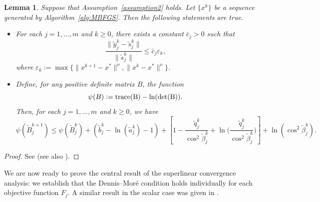\documentclass[11pt]{article}
\newtheorem{lemma}[theorem]{Lemma}
\numberwithin{assumption}{section}
\newcommand{\xs}{x^{\ast}}
\newcommand{\ty}{\tilde{y}_j^k}
\newcommand{\ts}{\tilde{s}_j^k}
\newcommand{\tq}{\tilde{q}_j^k}
\newcommand{\ta}{\tilde{a}_j^k}
\newcommand{\tB}{\tilde{B}_j^k}
\newcommand{\tb}{\tilde{b}_j^k}
\newcommand{\tr}{\rm{trace}}
\begin{document}
\begin{lemma}\label{l:rj}
Suppose that Assumption~\ref{assumption2} holds. Let $\{x^k\}$ be a sequence generated by Algorithm~\ref{alg:MBFGS}. Then the following statements are true.
\begin{itemize}
\item[(i)] For each $j=1,\ldots,m$ and $k\geq 0$, there exists a constant $\bar{c}_j>0$ such that
 \begin{equation}\label{brasilia}
 \dfrac{\|\ty-\ts\|}{\|\ts\|}\leq \bar{c}_j \varepsilon_k,
  \end{equation}
where $\varepsilon_k:=\max\{\|x^{k+1}-\xs\|^{\nu},\|x^{k}-\xs\|^{\nu}\}$.
\item[(ii)] Define, for any positive definite matrix $B$, the function $$\psi(B):=\tr(B)-\ln(\det(B)).$$
 Then, for each $j=1,\ldots,m$ and $k\geq 0$, we have
 \begin{equation}\label{fortaleza}
 \psi(\tilde{B}_j^{k+1})\leq \psi(\tB) +\left(\tb - \ln(\ta) -1\right) +\left[1 - \dfrac{\tq}{\cos^2\tilde{\beta}_j^k} + \ln\bigg(\dfrac{\tq}{\cos^2\tilde{\beta}_j^k}\bigg)\right]+ \ln(\cos^2\tilde{\beta}_j^k).
   \end{equation}
\end{itemize}
\end{lemma}
\begin{proof}
See \cite[Theorem~3.2]{Tool} (see also \cite[Section~6.4]{NoceWrig06}).
\end{proof}

We are now ready to prove the central result of the superlinear convergence analysis: we establish that the Dennis--Mor\'e condition  holds individually for each objective function $F_j$.
A similar result in the scalar case was given in \cite[Theorem~3.8]{Li-Fu-MBFGS}.
\end{document}
